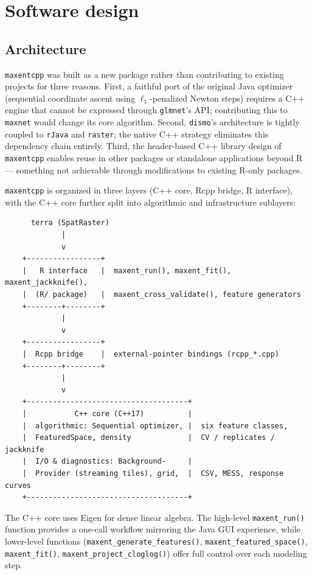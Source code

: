 \documentclass[10pt,letterpaper]{article}
\begin{document}
\section*{Software design}

\subsection*{Architecture}

\texttt{maxentcpp} was built as a new package rather than contributing
to existing projects for three reasons. First, a faithful port of the
original Java optimizer (sequential coordinate ascent using
\(\ell_1\)-penalized Newton steps) requires a C++ engine that cannot be
expressed through \texttt{glmnet}'s API; contributing this to
\texttt{maxnet} would change its core algorithm. Second,
\texttt{dismo}'s architecture is tightly coupled to \texttt{rJava} and
\texttt{raster}; the native C++ strategy eliminates this dependency
chain entirely. Third, the header-based C++ library design of
\texttt{maxentcpp} enables reuse in other packages or standalone
applications beyond R --- something not achievable through modifications
to existing R-only packages.

\texttt{maxentcpp} is organized in three layers (C++ core, Rcpp bridge,
R interface), with the C++ core further split into algorithmic and
infrastructure sublayers:

\begin{verbatim}
      terra (SpatRaster)
             |
             v
    +-----------------+
    |   R interface   |  maxent_run(), maxent_fit(), maxent_jackknife(),
    |  (R/ package)   |  maxent_cross_validate(), feature generators
    +--------+--------+
             |
             v
    +-----------------+
    |  Rcpp bridge    |  external-pointer bindings (rcpp_*.cpp)
    +--------+--------+
             |
             v
    +-------------------------------------+
    |           C++ core (C++17)          |
    |  algorithmic: Sequential optimizer, |  six feature classes,
    |  FeaturedSpace, density             |  CV / replicates / jackknife
    |  I/O & diagnostics: Background-     |
    |  Provider (streaming tiles), grid,  |  CSV, MESS, response curves
    +-------------------------------------+
\end{verbatim}

The C++ core uses Eigen \cite{Guennebaud2010} for dense linear algebra.
The high-level \texttt{maxent\_run()} function provides a one-call
workflow mirroring the Java GUI experience, while lower-level functions
(\texttt{maxent\_generate\_features()},
\texttt{maxent\_featured\_space()}, \texttt{maxent\_fit()},
\texttt{maxent\_project\_cloglog()}) offer full control over each
modeling step.
\end{document}
